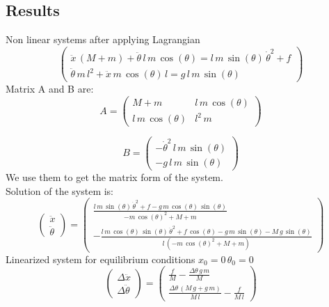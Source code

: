 \documentclass{article}
\begin{document}
\subsection*{Results}
Non linear systems after applying Lagrangian
\begin{equation}
   \left(\begin{array}{c} \ddot{x}\,\left(M+m\right)+\ddot{\theta}\,l\,m\,\cos\left(\theta\right)=l\,m\,\sin\left(\theta\right)\,{\dot{\theta}}^2+f\\ \ddot{\theta}\,m\,l^2+\ddot{x}\,m\,\cos\left(\theta\right)\,l=g\,l\,m\,\sin\left(\theta\right) \end{array}\right)
\end{equation}
Matrix A and B are:
\begin{equation*}
   A = \left(\begin{array}{cc} M+m & l\,m\,\cos\left(\theta\right)\\ l\,m\,\cos\left(\theta\right) & l^2\,m \end{array}\right)
\end{equation*}

\begin{equation*}
   B = \left(\begin{array}{c} -{\dot{\theta}}^2\,l\,m\,\sin\left(\theta\right)\\ -g\,l\,m\,\sin\left(\theta\right) \end{array}\right)
\end{equation*}
We use them to get the matrix form of the system.\\
Solution of the system is:
\begin{equation*}
   \left(\begin{array}{c} \ddot{x}\\ \ddot{\theta} \end{array}\right) =\left(\begin{array}{c} \frac{l\,m\,\sin\left(\theta\right)\,{\dot{\theta}}^2+f-g\,m\,\cos\left(\theta\right)\,\sin\left(\theta\right)}{-m\,{\cos\left(\theta\right)}^2+M+m}\\ -\frac{l\,m\,\cos\left(\theta\right)\,\sin\left(\theta\right)\,{\dot{\theta}}^2+f\,\cos\left(\theta\right)-g\,m\,\sin\left(\theta\right)-M\,g\,\sin\left(\theta\right)}{l\,\left(-m\,{\cos\left(\theta\right)}^2+M+m\right)} \end{array}\right)
\end{equation*}
Linearized system for equilibrium conditions $x_0 = 0 \, \theta_0 = 0 $
\begin{equation*}
   \left(\begin{array}{c} \Delta{\ddot{x}}\\ \Delta{\ddot{\theta}} \end{array}\right)  = \left(\begin{array}{c} \frac{f}{M}-\frac{\Delta{\theta}\,g\,m}{M}\\ \frac{\Delta{\theta}\,\left(M\,g+g\,m\right)}{M\,l}-\frac{f}{M\,l} \end{array}\right)
\end{equation*}
\end{document}
